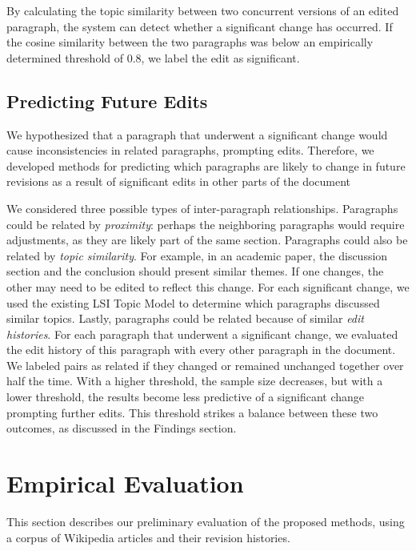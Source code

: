 By calculating the topic similarity between two concurrent versions of
an edited paragraph, the system can detect whether a significant change
has occurred. If the cosine similarity between the two paragraphs was
below an empirically determined threshold of 0.8, we label the edit as
significant.

\subsection{Predicting Future Edits}\label{predicting-future-edits}

We hypothesized that a paragraph that underwent a significant change
would cause inconsistencies in related paragraphs, prompting edits.
Therefore, we developed methods for predicting which paragraphs are
likely to change in future revisions as a result of significant edits in
other parts of the document

We considered three possible types of inter-paragraph relationships.
Paragraphs could be related by \emph{proximity}: perhaps the neighboring
paragraphs would require adjustments, as they are likely part of the
same section. Paragraphs could also be related by \emph{topic
similarity}. For example, in an academic paper, the discussion section
and the conclusion should present similar themes. If one changes, the
other may need to be edited to reflect this change. For each significant
change, we used the existing LSI Topic Model to determine which
paragraphs discussed similar topics. Lastly, paragraphs could be related
because of similar \emph{edit histories}. For each paragraph that
underwent a significant change, we evaluated the edit history of this
paragraph with every other paragraph in the document. We labeled pairs
as related if they changed or remained unchanged together over half the
time. With a higher threshold, the sample size decreases, but with a
lower threshold, the results become less predictive of a significant
change prompting further edits. This threshold strikes a balance between
these two outcomes, as discussed in the Findings section.

\section{Empirical Evaluation}\label{empirical-evaluation}

This section describes our preliminary evaluation of the proposed
methods, using a corpus of Wikipedia articles and their revision
histories.

